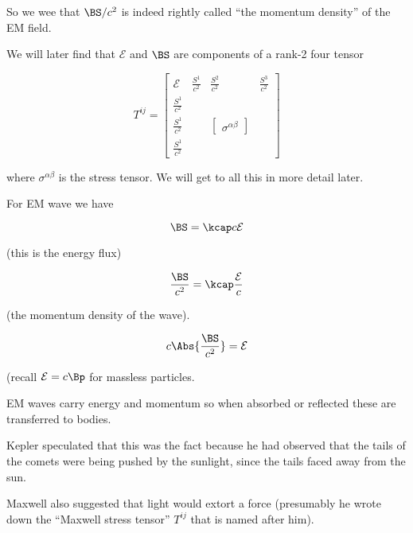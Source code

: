 So we wee that $\BS/c^2$ is indeed rightly called ``the momentum density'' of the EM field.

We will later find that $\mathcal{E}$ and $\BS$ are components of a rank-2 four tensor

\begin{equation}\label{eqn:relativisticElectrodynamicsL17:130}
T^{ij} = 
\begin{bmatrix}
\mathcal{E} & \frac{S^1}{c^2} & \frac{S^2}{c^2} & \frac{S^3}{c^2} \\
\frac{S^1}{c^2} & & & \\
\frac{S^1}{c^2} & & 
\begin{bmatrix}
\sigma^{\alpha\beta} 
\end{bmatrix}
& \\
\frac{S^1}{c^2} & & & 
\end{bmatrix}
\end{equation}

where $\sigma^{\alpha\beta}$ is the stress tensor.  We will get to all this in more detail later.

For EM wave we have

\begin{equation}\label{eqn:relativisticElectrodynamicsL17:150}
\BS = \kcap c \mathcal{E}
\end{equation}

(this is the energy flux)

\begin{equation}\label{eqn:relativisticElectrodynamicsL17:170}
\frac{\BS}{c^2} = \kcap \frac{\mathcal{E}}{c}
\end{equation}

(the momentum density of the wave).

\begin{equation}\label{eqn:relativisticElectrodynamicsL17:190}
c \Abs{\frac{\BS}{c^2}} = \mathcal{E}
\end{equation}

(recall $\mathcal{E} = c\mathcal{\Bp}$ for massless particles.

EM waves carry energy and momentum so when absorbed or reflected these are transferred to bodies.

Kepler speculated that this was the fact because he had observed that the tails of the comets were being pushed by the sunlight, since the tails faced away from the sun.

Maxwell also suggested that light would extort a force (presumably he wrote down the ``Maxwell stress tensor'' $T^{ij}$ that is named after him).

